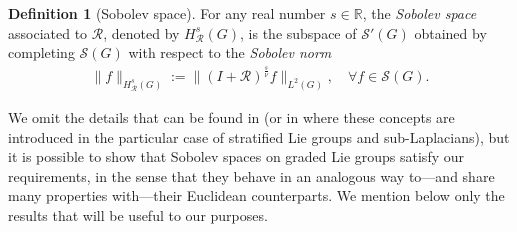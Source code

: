 \documentclass[12pt,oneside,a4paper]{book}
\numberwithin{equation}{section}     %
\theoremstyle{plain}
\theoremstyle{definition}
\newtheorem{definition}[theorem]{Definition}
\newcommand{\R}{{\mathbb R}}
\begin{document}
\begin{definition}[Sobolev space]\label{defSobolev}
	For any real number $s\in\R$, the \textit{Sobolev space} associated to $\mathcal R$, denoted by $H^s_\mathcal R(G)$, is the subspace of $\mathcal S'(G)$ obtained by completing $\mathcal S(G)$ with respect to the \textit{Sobolev norm}
	\begin{align*}
	\|f\|_{H^s_\mathcal R(G)}:=\|(I+\mathcal R)^{\frac{s}{\nu}}f\|_{L^2(G)},\quad \forall f\in \mathcal S(G).
	\end{align*}
\end{definition}
We omit the details that can be found in \cite[Chapter 4.4]{FR2016} (or in \cite[Section 4]{F75} where these concepts are introduced in the particular case of stratified Lie groups and sub-Laplacians), but it is possible to show that Sobolev spaces on graded Lie groups satisfy our requirements, in the sense that they behave in an analogous way to---and share many properties with---their Euclidean counterparts. We mention below only the results that will be useful to our purposes.
\end{document}
